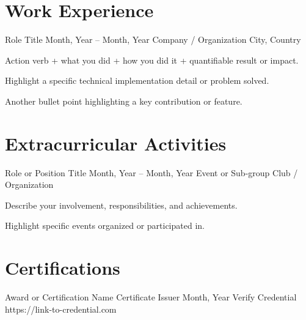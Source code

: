 \documentclass[11pt, a4paper]{article}
\begin{document}
\section{Work Experience}
\resumeExperience
    {Role Title}
    {Month, Year – Month, Year}
    {Company / Organization}
    {City, Country}
    {
        \item Action verb + what you did + how you did it + quantifiable result or impact.
        \item Highlight a specific technical implementation detail or problem solved.
        \item Another bullet point highlighting a key contribution or feature.
    }


\section{Extracurricular Activities}
\resumeExtracurricularActivity
    {Role or Position Title}
    {Month, Year – Month, Year}
    {Event or Sub-group}
    {Club / Organization}
    {
        \item Describe your involvement, responsibilities, and achievements.
        \item Highlight specific events organized or participated in.
    }


\section{Certifications}
\resumeCert
    {Award or Certification Name}
    {Certificate Issuer}
    {Month, Year}
    {Verify Credential}
    {https://link-to-credential.com}
\end{document}

